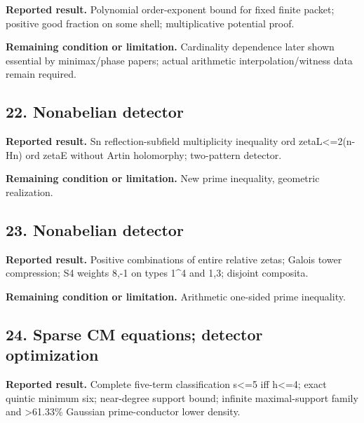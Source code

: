 \textbf{Reported result.} Polynomial order-exponent bound for fixed finite packet; positive good fraction on some shell; multiplicative potential proof.

\textbf{Remaining condition or limitation.} Cardinality dependence later shown essential by minimax/phase papers; actual arithmetic interpolation/witness data remain required.

\subsection*{22. Nonabelian detector}

\href{https://github.com/VladimirReshetnikov/ProveIt/blob/274841c1cb137aafbb60ab5f519c51fd42eee98e/docs/incoming/grh_reflection_transfer_2026-11-25.zip}{}

\textbf{Reported result.} Sn reflection-subfield multiplicity inequality ord zetaL<=2(n-Hn) ord zetaE without Artin holomorphy; two-pattern detector.

\textbf{Remaining condition or limitation.} New prime inequality, geometric realization.

\subsection*{23. Nonabelian detector}

\href{https://github.com/VladimirReshetnikov/ProveIt/blob/274841c1cb137aafbb60ab5f519c51fd42eee98e/docs/incoming/grh_relative_prime_races_2026-11-25.zip}{}

\textbf{Reported result.} Positive combinations of entire relative zetas; Galois tower compression; S4 weights 8,-1 on types 1\textasciicircum{}4 and 1,3; disjoint composita.

\textbf{Remaining condition or limitation.} Arithmetic one-sided prime inequality.

\subsection*{24. Sparse CM equations; detector optimization}

\href{https://github.com/VladimirReshetnikov/ProveIt/blob/274841c1cb137aafbb60ab5f519c51fd42eee98e/docs/incoming/grh_sparse_singular_moduli.zip}{}

\textbf{Reported result.} Complete five-term classification s<=5 iff h<=4; exact quintic minimum six; near-degree support bound; infinite maximal-support family and >61.33\% Gaussian prime-conductor lower density.

